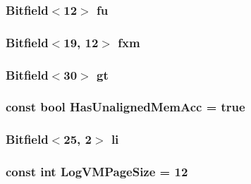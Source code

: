 \label{namespacePowerISA_aabd6fa5889c9ccc124dfd4a984046f6f}
\hypertarget{namespacePowerISA_a48111db89d0875c9e050dafabe22e436}{
\subsubsection[{fu}]{\setlength{\rightskip}{0pt plus 5cm}Bitfield$<$12$>$ {\bf fu}}}
\label{namespacePowerISA_a48111db89d0875c9e050dafabe22e436}
\hypertarget{namespacePowerISA_ab4e16105ce8c4586d3541781be8e35db}{
\subsubsection[{fxm}]{\setlength{\rightskip}{0pt plus 5cm}Bitfield$<$19, 12$>$ {\bf fxm}}}
\label{namespacePowerISA_ab4e16105ce8c4586d3541781be8e35db}
\hypertarget{namespacePowerISA_a73053d25e50297e1394dd73b90816e43}{
\subsubsection[{gt}]{\setlength{\rightskip}{0pt plus 5cm}Bitfield$<$30$>$ {\bf gt}}}
\label{namespacePowerISA_a73053d25e50297e1394dd73b90816e43}
\hypertarget{namespacePowerISA_a1c3adbc67ce574fe545e332d3bc677be}{
\subsubsection[{HasUnalignedMemAcc}]{\setlength{\rightskip}{0pt plus 5cm}const bool {\bf HasUnalignedMemAcc} = true}}
\label{namespacePowerISA_a1c3adbc67ce574fe545e332d3bc677be}
\hypertarget{namespacePowerISA_a7792690f85ba1d3e3f23ad42037ddf16}{
\subsubsection[{li}]{\setlength{\rightskip}{0pt plus 5cm}Bitfield$<$25, 2$>$ {\bf li}}}
\label{namespacePowerISA_a7792690f85ba1d3e3f23ad42037ddf16}
\hypertarget{namespacePowerISA_a554fef169d109a5ccb7ce0dd6a43e521}{
\subsubsection[{LogVMPageSize}]{\setlength{\rightskip}{0pt plus 5cm}const int {\bf LogVMPageSize} = 12}}
